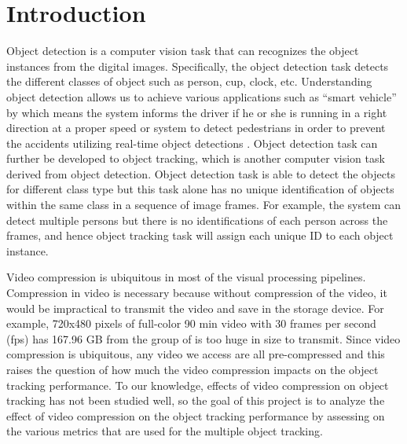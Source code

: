 \chapter{Introduction}
\label{chap:introduction}


%

Object detection is a computer vision task that can recognizes the object instances from the digital images. Specifically, the object detection task detects the different classes of object such as person, cup, clock, etc. Understanding object detection allows us to achieve various applications such as “smart vehicle” by which means the system informs the driver if he or she is running in a right direction at a proper speed or system to detect pedestrians in order to prevent the accidents utilizing real-time object detections \cite{gavrila_real-time_1999}. Object detection task can further be developed to object tracking, which is another computer vision task derived from object detection. Object detection task is able to detect the objects for different class type but this task alone has no unique identification of objects within the same class in a sequence of image frames. For example, the system can detect multiple persons but there is no identifications of each person across the frames, and hence object tracking task will assign each unique ID to each object instance.

Video compression is ubiquitous in most of the visual processing pipelines. Compression in video is necessary because without compression of the video, it would be impractical to transmit the video and save in the storage device. For example, 720x480 pixels of full-color 90 min video with 30 frames per second (fps) has 167.96 GB from the group of \citeauthor{ponlatha_comparison_2013} \cite{ponlatha_comparison_2013} is too huge in size to transmit. Since video compression is ubiquitous, any video we access are all pre-compressed and this raises the question of how much the video compression impacts on the object tracking performance. To our knowledge, effects of video compression on object tracking has not been studied well, so the goal of this project is to analyze the effect of video compression on the object tracking performance by assessing on the various metrics that are used for the multiple object tracking.

